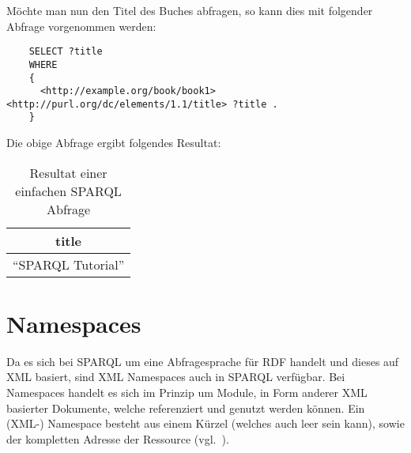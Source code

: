 Möchte man nun den Titel des Buches abfragen, so kann dies mit folgender Abfrage vorgenommen werden:
\begin{lstlisting}
    SELECT ?title
    WHERE
    {
      <http://example.org/book/book1> <http://purl.org/dc/elements/1.1/title> ?title .
    }
\end{lstlisting}

Die obige Abfrage ergibt folgendes Resultat:
\noindent\hspace*{15mm}
\begin{table}[h]
    \centering
    \begin{tabular}{|l|}
        \hline
        \multicolumn{1}{|c|}{\textbf{title}} \\ \hline
        ``SPARQL Tutorial''                    \\ \hline
    \end{tabular}
    \caption{Resultat einer einfachen SPARQL Abfrage\protect\footnotemark}
\end{table}

\section{Namespaces}
\label{sec:sparql_namespaces}

Da es sich bei SPARQL um eine Abfragesprache für RDF handelt und dieses auf XML basiert, sind XML Namespaces auch in SPARQL verfügbar. Bei Namespaces handelt es sich im Prinzip um Module, in Form anderer XML basierter Dokumente, welche referenziert und genutzt werden können. Ein (XML-) Namespace besteht aus einem Kürzel (welches auch leer sein kann), sowie der kompletten Adresse der Ressource (vgl.~\cite[2.1 Introduction]{w3rdf_syntax}).

